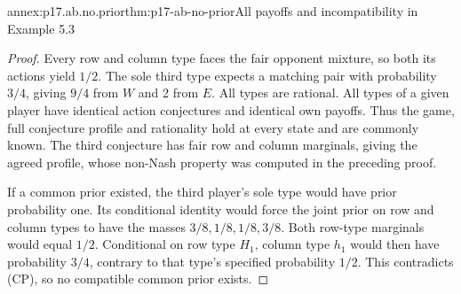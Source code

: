 \begin{annexitem}{annex:p17.ab.no.prior}{thm:p17-ab-no-prior}{All payoffs and incompatibility in Example 5.3}
\begin{proof}
Every row and column type faces the fair opponent mixture,
so both its actions yield \(1/2\). The sole third type
expects a matching pair with probability \(3/4\), giving
\(9/4\) from \(W\) and 2 from \(E\). All types are rational.
All types of a given player have identical action conjectures
and identical own payoffs. Thus the game, full conjecture
profile and rationality hold at every state and are commonly
known. The third conjecture has fair row and column marginals,
giving the agreed profile, whose non-Nash property was computed
in the preceding proof.

If a common prior existed, the third player's sole type
would have prior probability one. Its conditional identity
would force the joint prior on row and column types to have
the masses \(3/8,1/8,1/8,3/8\). Both row-type marginals
would equal \(1/2\). Conditional on row type \(H_1\),
column type \(h_1\) would then have probability \(3/4\),
contrary to that type's specified probability \(1/2\).
This contradicts (CP), so no compatible common prior exists.
\end{proof}
\end{annexitem}

